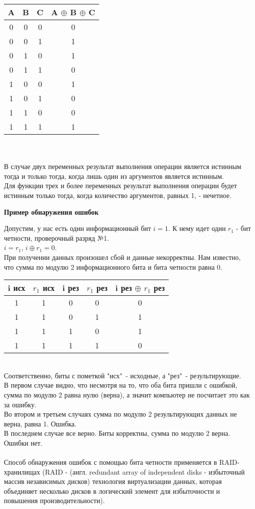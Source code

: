 \begin{minipage}[l]{6cm}
\begin{tabular}{|c|c|c|c|}
\hline
A & B & C & A $\oplus$ B $\oplus$ C\\
\hline
0 & 0 & 0 & 0 \\
0 & 0 & 1 & 1 \\
0 & 1 & 0 & 1 \\
0 & 1 & 1 & 0 \\
1 & 0 & 0 & 1 \\
1 & 0 & 1 & 0 \\
1 & 1 & 0 & 0 \\
1 & 1 & 1 & 1 \\
\hline
\end{tabular}
\end{minipage}
\\
\\В случае двух переменных результат выполнения операции является истинным тогда и только тогда, когда лишь один из аргументов является истинным.
\\Для функции трех и более переменных результат выполнения операции будет истинным только тогда, когда количество аргументов, равных 1, - нечетное.
\begin{center}
  \textbf{Пример обнаружения ошибок}
\end{center}
Допустим, у нас есть один информационный бит $i = 1$. К нему идет один $r_1$ - бит четности, проверочный разряд №1.
\\$i = r_1$, $i \oplus r_1 = 0$.
\\При получении данных произошел сбой и данные некорректны. Нам известно, что сумма по модулю 2 информационного бита и бита четности равна 0.
\begin{table}[h]
\begin{tabular}{|c|c|c|c|c|}
\hline
i исх & $r_{1}$ исх & i рез & $r_{1}$ рез & i рез $\oplus$ $r_{1}$ рез \\
\hline
1 & 1 & 0 & 0 & 0 \\
1 & 1 & 0 & 1 & 1 \\
1 & 1 & 1 & 0 & 1 \\
1 & 1 & 1 & 1 & 0 \\
\hline
\end{tabular}
\end{table}
\\Соответственно, биты с пометкой "исх"\ - исходные, а "рез"\ - результирующие.
\\В первом случае видно, что несмотря на то, что оба бита пришли с ошибкой, сумма по модулю 2 равна нулю (верна), а значит компьютер не посчитает это как за ошибку.
\\Во втором и третьем случаях сумма по модулю 2 результирующих данных не верна, равна 1. Ошибка.
\\В последнем случае все верно. Биты корректны, сумма по модулю 2 верна. Ошибки нет.
\\
\\Способ обнаружения ошибок с помощью бита четности применяется в RAID-хранилищах (RAID - (англ. redundant array of independent disks - избыточный массив независимых дисков) технология виртуализации данных, которая объединяет несколько дисков в логический элемент для избыточности и повышения производительности).

